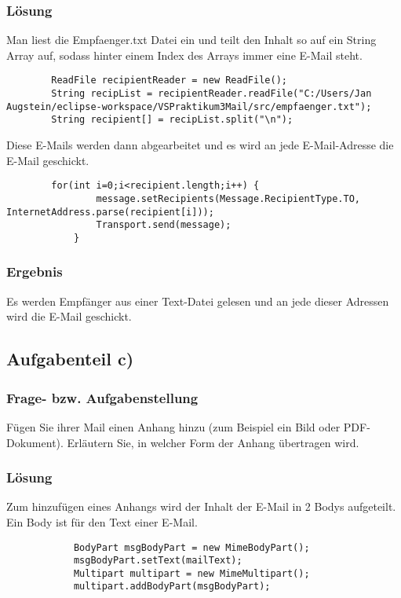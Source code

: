 \subsubsection{Lösung}
Man liest die Empfaenger.txt Datei ein und teilt den Inhalt so auf ein String Array auf, sodass hinter einem Index des Arrays immer eine E-Mail steht. 
\begin{lstlisting}
		ReadFile recipientReader = new ReadFile();
		String recipList = recipientReader.readFile("C:/Users/Jan Augstein/eclipse-workspace/VSPraktikum3Mail/src/empfaenger.txt");
		String recipient[] = recipList.split("\n");
\end{lstlisting} 


Diese E-Mails werden dann abgearbeitet und es wird an jede E-Mail-Adresse die E-Mail geschickt.
\begin{lstlisting}
		for(int i=0;i<recipient.length;i++) {
				message.setRecipients(Message.RecipientType.TO, InternetAddress.parse(recipient[i]));
				Transport.send(message);
			}
\end{lstlisting}

\subsubsection{Ergebnis}
Es werden Empfänger aus einer Text-Datei gelesen und an jede dieser Adressen wird die E-Mail geschickt.

\subsection{Aufgabenteil c)}
\subsubsection{Frage- bzw. Aufgabenstellung}
 Fügen Sie ihrer Mail einen Anhang hinzu (zum Beispiel ein Bild oder PDF-Dokument). Erläutern Sie, in welcher Form der Anhang übertragen wird.

\subsubsection{Lösung}
Zum hinzufügen eines Anhangs wird der Inhalt der E-Mail in 2 Bodys aufgeteilt. Ein Body ist für den Text einer E-Mail.
\begin{lstlisting}
			BodyPart msgBodyPart = new MimeBodyPart();
			msgBodyPart.setText(mailText);
			Multipart multipart = new MimeMultipart();
			multipart.addBodyPart(msgBodyPart);
\end{lstlisting}


